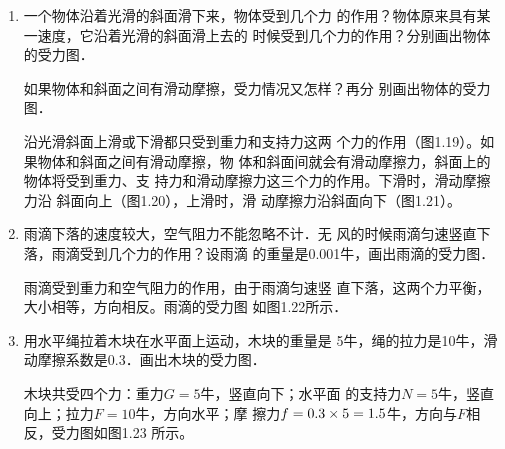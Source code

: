\begin{enumerate}
\item 一个物体沿着光滑的斜面滑下来，物体受到几个力
的作用？物体原来具有某一速度，它沿着光滑的斜面滑上去的
时候受到几个力的作用？分别画出物体的受力图．

    如果物体和斜面之间有滑动摩擦，受力情况又怎样？再分
别画出物体的受力图．

\begin{solution}
    沿光滑斜面上滑或下滑都只受到重力和支持力这两
个力的作用（图1.19）。如果物体和斜面之间有滑动摩擦，物
体和斜面间就会有滑动摩擦力，斜面上的物体将受到重力、支
持力和滑动摩擦力这三个力的作用。下滑时，滑动摩擦力沿
斜面向上（图1.20），上滑时，滑
动摩擦力沿斜面向下（图1.21）。
\end{solution}
\item 雨滴下落的速度较大，空气阻力不能忽略不计．无
风的时候雨滴匀速竖直下落，雨滴受到几个力的作用？设雨滴
的重量是0.001牛，画出雨滴的受力图．

\begin{solution}
    雨滴受到重力和空气阻力的作用，由于雨滴匀速竖
    直下落，这两个力平衡，大小相等，方向相反。雨滴的受力图
    如图1.22所示．
\end{solution}
\item 用水平绳拉着木块在水平面上运动，木块的重量是
5牛，绳的拉力是10牛，滑动摩擦系数是0.3．画出木块的受力图．


\begin{solution}
    木块共受四个力：重力$G=5$牛，竖直向下；水平面
的支持力$N=5$牛，竖直向上；拉力$F=10$牛，方向水平；摩
擦力$f=0.3\times5=1.5$牛，方向与$F$相反，受力图如图1.23
所示。


\end{solution}

\begin{figure}[htp]\centering
    \begin{minipage}[t]{0.48\textwidth}
    \centering
{}
    \caption{}
    \end{minipage}
    \begin{minipage}[t]{0.48\textwidth}
    \centering
{}
    \caption{}
    \end{minipage}
    \end{figure}


\end{enumerate}
